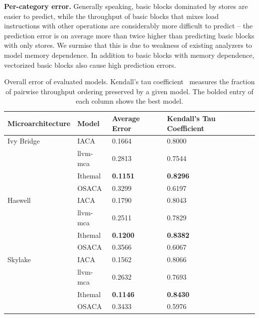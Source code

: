 \textbf{Per-category error.} Generally speaking, basic blocks dominated by stores
 are easier to predict,
while the throughput of basic blocks that mixes load instructions
with other operations are considerably
more difficult to predict -- the prediction error is on average more than
twice higher than predicting basic blocks with only stores. 
We surmise that this is due to weakness of existing analyzers to model 
memory dependence.
In addition to basic blocks with memory dependence,
vectorized basic blocks also cause high prediction errors.
\fi



\begin{table}
\begin{tabular}
{|p{}|p{}|p{}|p{}|}
\hline

\textbf{Microarchitecture} & \textbf{Model} &
\textbf{Average Error} & \textbf{Kendall's Tau Coefficient} \\
\hline

Ivy Bridge & IACA & 0.1664 & 0.8000\\
    & llvm-mca & 0.2813 & 0.7544\\
    & Ithemal & \textbf{0.1151} & \textbf{0.8296}\\
    & OSACA & 0.3299 & 0.6197\\
\hline

Haswell & IACA & 0.1790 & 0.8043\\
    & llvm-mca & 0.2511 & 0.7829\\
    & Ithemal & \textbf{0.1200} & \textbf{0.8382}\\
    & OSACA & 0.3566 & 0.6067\\
    
\hline 
Skylake & IACA & 0.1562 & 0.8066\\
    & llvm-mca & 0.2632 & 0.7693\\
    & Ithemal & \textbf{0.1146} & \textbf{0.8430}\\
    & OSACA & 0.3433 & 0.5976\\

\hline
\end{tabular}
\\
\caption{Overall error of evaluated models. Kendall's tau coefficient~\cite{kendalltau}
measures the fraction of pairwise throughput ordering preserved by a given model.
The bolded entry of each column shows the best model.}
\label{tab:overall}
\end{table}

